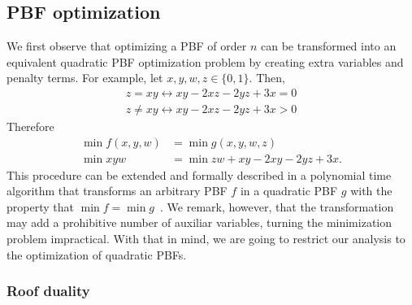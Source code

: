 \subsection{PBF optimization}
 We first observe that optimizing a PBF of order $n$ can be transformed into an equivalent quadratic PBF optimization problem by creating extra variables and penalty terms. For example, let $x,y,w,z \in \{0,1\}$. Then,
 \begin{align*}
 	z=xy \leftrightarrow  xy -2xz-2yz+3x=0 \\
 	z \neq xy \leftrightarrow  xy -2xz-2yz+3x>0
 \end{align*}
%
 Therefore
\begin{align*}
	\min f(x,y,w) &= \min g(x,y,w,z) \\
    \min xyw &= \min zw + xy -2xy -2yz +3x .
\end{align*} 
%
  This procedure can be extended and formally described in a polynomial time algorithm that transforms an arbitrary PBF $f$ in a quadratic PBF $g$ with the property that $\min f = \min g$~\cite{boros02pseudo}. We remark, however, that the transformation may add a prohibitive number of auxiliar variables, turning the minimization problem impractical. With that in mind, we are going to restrict our analysis to the optimization of quadratic PBFs.
  
\subsubsection{Roof duality}

